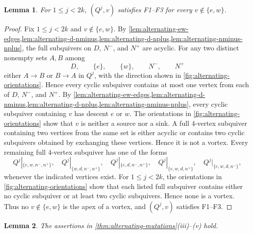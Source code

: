 \documentclass[10pt,a4paper]{amsart}
\newtheorem{lemma}[lemma]{Lemma}
\theoremstyle{definition}
\theoremstyle{definition}
\numberwithin{equation}{section}
\numberwithin{table}{section}
\newcommand{\nminus}{N^{-}}
\newcommand{\nplus}{N^{+}}
\newcommand{\Qalt}[1]{Q^{#1}}
\begin{document}
\begin{lemma}\label{lem:alternating-interior}
For $1\le j<2k$, $(\Qalt{j},v)$ satisfies F1--F3 for every
$v\notin\{e,w\}$.
\end{lemma}

\begin{proof}
Fix $1\le j<2k$ and $v\notin\{e,w\}$. By
\cref{lem:alternating-ew-edges,lem:alternating-d-nminus,lem:alternating-d-nplus,lem:alternating-nminus-nplus},
the full subquivers on $D$, $\nminus$, and $\nplus$ are acyclic. For any two
distinct nonempty sets $A,B$ among
\[
 D,\qquad \{e\},\qquad \{w\},\qquad \nminus,\qquad \nplus
\]
either $A\to B$ or $B\to A$ in $\Qalt{j}$, with the direction shown in
\cref{fig:alternating-orientations}. Hence every cyclic subquiver contains at most one vertex
from each of $D$, $\nminus$, and $\nplus$. By \cref{lem:alternating-ew-edges,lem:alternating-d-nminus,lem:alternating-d-nplus,lem:alternating-nminus-nplus},
every cyclic subquiver containing $v$ has descent $e$ or $w$.
The orientations in \cref{fig:alternating-orientations} show that $v$ is
neither a source nor a sink. A full $4$-vertex subquiver containing two
vertices from the same set is either acyclic or contains two cyclic subquivers
obtained by exchanging these vertices. Hence it is not a vortex. Every
remaining full $4$-vertex subquiver has one of the forms
\[
 \Qalt{j}|_{\{e,w,n^-,n^+\}},\quad
 \Qalt{j}|_{\{w,d,n^-,n^+\}},\quad
 \Qalt{j}|_{\{e,d,n^-,n^+\}},\quad
 \Qalt{j}|_{\{e,w,d,n^+\}},\quad
 \Qalt{j}|_{\{e,w,d,n^-\}},
\]
whenever the indicated vertices exist. For $1\le j<2k$, the orientations in
\cref{fig:alternating-orientations} show that each listed full subquiver
contains either no cyclic subquiver or at least two cyclic subquivers. Hence
none is a vortex. Thus no $v\notin\{e,w\}$ is the apex of a vortex, and
$(\Qalt{j},v)$ satisfies F1--F3.
\end{proof}

\begin{lemma}\label{lem:alternating-boundary}
The assertions in \cref{thm:alternating-mutations}\textup{(iii)--(v)} hold.
\end{lemma}
\end{document}
